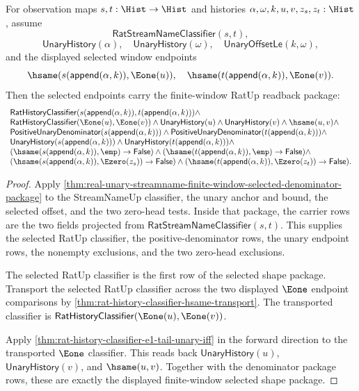 
\begin{theorem}
\label{thm:real-unary-streamname-finite-window-selected-shape-package}
For observation maps $s,t:\Hist\to\Hist$ and histories
$\alpha,\omega,k,u,v,z_s,z_t:\Hist$, assume
$$
\mathsf{RatStreamNameClassifier}(s,t),
$$
$$
\mathsf{UnaryHistory}(\alpha),\quad
\mathsf{UnaryHistory}(\omega),\quad
\mathsf{UnaryOffsetLe}(k,\omega),
$$
and the displayed selected window endpoints
$$
\hsame(s(\mathsf{append}(\alpha,k)),\Eone(u)),
\quad
\hsame(t(\mathsf{append}(\alpha,k)),\Eone(v)).
$$
Then the selected endpoints carry the finite-window RatUp readback package:
$$
\begin{array}{l}
\mathsf{RatHistoryClassifier}(s(\mathsf{append}(\alpha,k)),t(\mathsf{append}(\alpha,k)))\land\\
\mathsf{RatHistoryClassifier}(\Eone(u),\Eone(v))\land
\mathsf{UnaryHistory}(u)\land
\mathsf{UnaryHistory}(v)\land
\hsame(u,v)\land\\
\mathsf{PositiveUnaryDenominator}(s(\mathsf{append}(\alpha,k)))\land
\mathsf{PositiveUnaryDenominator}(t(\mathsf{append}(\alpha,k)))\land\\
\mathsf{UnaryHistory}(s(\mathsf{append}(\alpha,k)))\land
\mathsf{UnaryHistory}(t(\mathsf{append}(\alpha,k)))\land\\
(\hsame(s(\mathsf{append}(\alpha,k)),\emp)\to\mathsf{False})\land
(\hsame(t(\mathsf{append}(\alpha,k)),\emp)\to\mathsf{False})\land\\
(\hsame(s(\mathsf{append}(\alpha,k)),\Ezero(z_s))\to\mathsf{False})\land
(\hsame(t(\mathsf{append}(\alpha,k)),\Ezero(z_t))\to\mathsf{False}).
\end{array}
$$
\end{theorem}
\begin{proof}
Apply
\autoref{thm:real-unary-streamname-finite-window-selected-denominator-package}
to the StreamNameUp classifier, the unary anchor and bound, the selected
offset, and the two zero-head tests. Inside that package, the carrier rows are
the two fields projected from $\mathsf{RatStreamNameClassifier}(s,t)$. This
supplies the selected RatUp classifier, the positive-denominator rows, the
unary endpoint rows, the nonempty exclusions, and the two zero-head exclusions.

The selected RatUp classifier is the first row of the selected shape package.
Transport the selected RatUp classifier across the two displayed $\Eone$
endpoint comparisons by \autoref{thm:rat-history-classifier-hsame-transport}.
The transported classifier is
$\mathsf{RatHistoryClassifier}(\Eone(u),\Eone(v))$.

Apply \autoref{thm:rat-history-classifier-e1-tail-unary-iff} in the forward
direction to the transported $\Eone$ classifier. This reads back
$\mathsf{UnaryHistory}(u)$, $\mathsf{UnaryHistory}(v)$, and $\hsame(u,v)$.
Together with the denominator package rows, these are exactly the displayed
finite-window selected shape package.
\end{proof}

